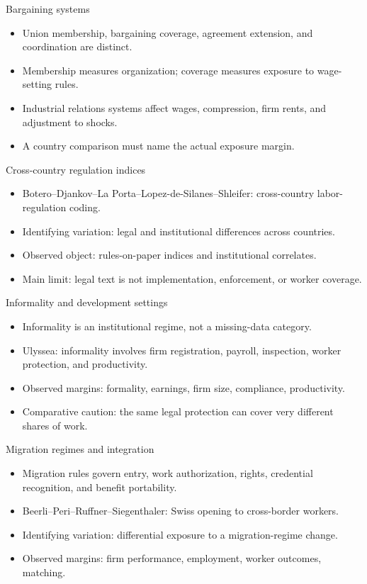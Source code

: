 \documentclass[aspectratio=169,11pt]{beamer}
\begin{document}
\begin{frame}{Bargaining systems}
\begin{itemize}
    \item Union membership, bargaining coverage, agreement extension, and coordination are distinct.
    \item Membership measures organization; coverage measures exposure to wage-setting rules.
    \item Industrial relations systems affect wages, compression, firm rents, and adjustment to shocks.
    \item A country comparison must name the actual exposure margin.
\end{itemize}
\end{frame}

\begin{frame}{Cross-country regulation indices}
\begin{itemize}
    \item Botero--Djankov--La Porta--Lopez-de-Silanes--Shleifer: cross-country labor-regulation coding.
    \item Identifying variation: legal and institutional differences across countries.
    \item Observed object: rules-on-paper indices and institutional correlates.
    \item Main limit: legal text is not implementation, enforcement, or worker coverage.
\end{itemize}
\end{frame}

\begin{frame}{Informality and development settings}
\begin{itemize}
    \item Informality is an institutional regime, not a missing-data category.
    \item Ulyssea: informality involves firm registration, payroll, inspection, worker protection, and productivity.
    \item Observed margins: formality, earnings, firm size, compliance, productivity.
    \item Comparative caution: the same legal protection can cover very different shares of work.
\end{itemize}
\end{frame}

\begin{frame}{Migration regimes and integration}
\begin{itemize}
    \item Migration rules govern entry, work authorization, rights, credential recognition, and benefit portability.
    \item Beerli--Peri--Ruffner--Siegenthaler: Swiss opening to cross-border workers.
    \item Identifying variation: differential exposure to a migration-regime change.
    \item Observed margins: firm performance, employment, worker outcomes, matching.
\end{itemize}
\end{frame}
\end{document}
